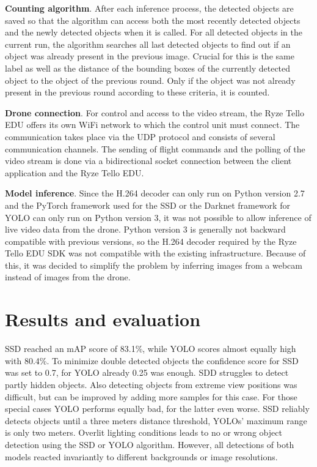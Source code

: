 \documentclass[a4paper, 10pt, journal]{wissarbIEEE}      %
\begin{document}
\textbf{Counting algorithm}. After each inference process, the detected objects are saved so that the algorithm can access both the most recently detected objects and the newly detected objects when it is called. For all detected objects in the current run, the algorithm searches all last detected objects to find out if an object was already present in the previous image. Crucial for this is the same label as well as the distance of the bounding boxes of the currently detected object to the object of the previous round. Only if the object was not already present in the previous round according to these criteria, it is counted.

\textbf{Drone connection}. For control and access to the video stream, the Ryze Tello EDU offers its own WiFi network to which the control unit must connect. The communication takes place via the UDP protocol and consists of several communication channels. The sending of flight commands and the polling of the video stream is done via a bidirectional socket connection between the client application and the Ryze Tello EDU.

\textbf{Model inference}. Since the H.264 decoder can only run on Python version 2.7 and the PyTorch framework used for the SSD or the Darknet framework for YOLO can only run on Python version 3, it was not possible to allow inference of live video data from the drone. Python version 3 is generally not backward compatible with previous versions, so the H.264 decoder required by the Ryze Tello EDU SDK was not compatible with the existing infrastructure. Because of this, it was decided to simplify the problem by inferring images from a webcam instead of images from the drone.

\section{Results and evaluation} \label{evaluation}

SSD reached an mAP score of 83.1\%, while YOLO scores almost equally high with 80.4\%. To minimize double detected objects the confidence score for SSD was set to 0.7, for YOLO already 0.25 was enough. SDD struggles to detect partly hidden objects. Also detecting objects from extreme view positions was difficult, but can be improved by adding more samples for this case. For those special cases YOLO performs equally bad, for the latter even worse. SSD reliably detects objects until a three meters distance threshold, YOLOs' maximum range is only two meters. Overlit lighting conditions leads to no or wrong object detection using the SSD or YOLO algorithm. However, all detections of both models reacted invariantly to different backgrounds or image resolutions. 
\end{document}
